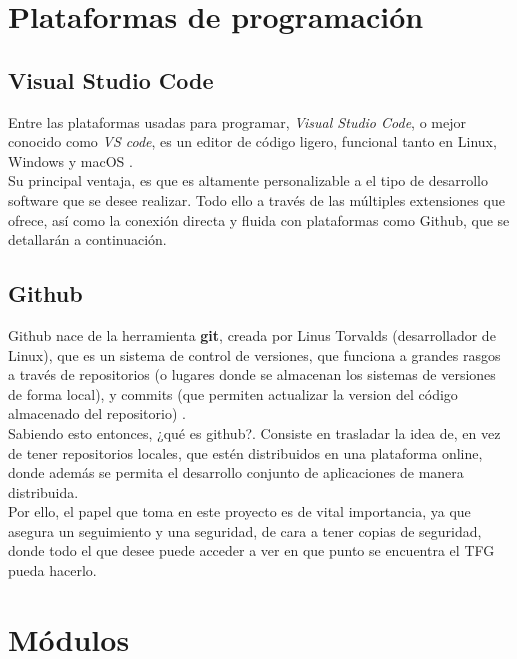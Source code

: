 \section{Plataformas de programación}
\label{sec:plataformas_de_programacion}

\subsection{Visual Studio Code}
\label{subsec:visual_studio_code}

Entre las plataformas usadas para programar, \emph{Visual Studio Code}, o mejor conocido como \emph{VS code}, es un editor de código ligero, funcional tanto en Linux, Windows y macOS \cite{vscode-def}.\\

Su principal ventaja, es que es altamente personalizable a el tipo de desarrollo software que se desee realizar. Todo ello a través de las múltiples extensiones que ofrece, así como la conexión directa y fluida con plataformas como Github, que se detallarán a continuación.\\

\subsection{Github}
\label{subsec:github}

Github nace de la herramienta \textbf{git}, creada por Linus Torvalds (desarrollador de Linux), que es un sistema de control de versiones, que funciona a grandes rasgos a través de repositorios (o lugares donde se almacenan los sistemas de versiones de forma local), y commits (que permiten actualizar la version del código almacenado del repositorio) \cite{github-def}.\\

Sabiendo esto entonces, ¿qué es github?. Consiste en trasladar la idea de, en vez de tener repositorios locales, que estén distribuidos en una plataforma online, donde además se permita el desarrollo conjunto de aplicaciones de manera distribuida.\\

Por ello, el papel que toma en este proyecto es de vital importancia, ya que asegura un seguimiento y una seguridad, de cara a tener copias de seguridad, donde todo el que desee puede acceder a ver en que punto se encuentra el \ac{TFG} pueda hacerlo.\\

\section{Módulos}
\label{sec:modulos}

